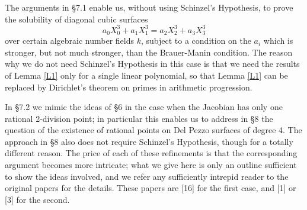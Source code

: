 \documentclass[12pt]{article}
\def\beq{\begin{equation} \label}
\begin{document}
The arguments in \S7.1 enable us, without using Schinzel's
Hypothesis, to prove the solubility of
diagonal cubic surfaces
\beq{E39} a_0X_0^3+a_1X_1^3=a_2X_2^3+a_3X_3^3 \end{equation}
over certain algebraic number fields $k$, subject to a
condition on the $a_i$ which is stronger, but not much
stronger, than the Brauer-Manin condition. The
reason why we do not need Schinzel's Hypothesis in this case
is that we need the results of Lemma \ref{L1} only for a
single linear polynomial, so that
Lemma \ref{L1} can be replaced by Dirichlet's theorem on
primes in arithmetic progression.

In \S7.2 we mimic the ideas of \S6 in the
case when the Jacobian has only one rational 2-division point;
in particular this enables us to address in \S8 the question
of the existence of rational points on Del Pezzo surfaces of
degree 4. The approach in \S8 also does not require Schinzel's
Hypothesis, though for a totally different reason.
The price of each of these refinements is that the
corresponding argument becomes more
intricate; what we give here is only an outline sufficient
to show the ideas involved, and we refer any sufficiently
intrepid reader to the original papers
for the details. These papers are [16] for the first case,
and [1] or [3] for the second.

\bigskip
\end{document}

